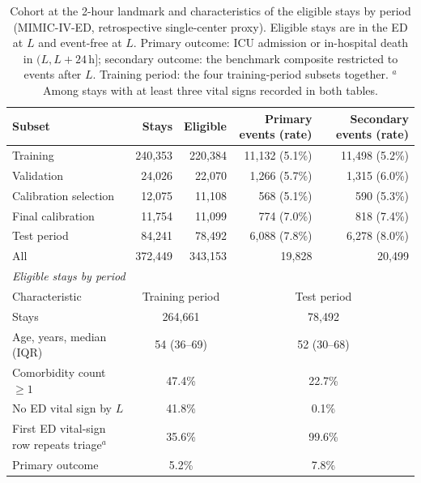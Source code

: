 \begin{table}[t]
\centering
\caption{Cohort at the 2-hour landmark and characteristics of the eligible stays by period (MIMIC-IV-ED, retrospective single-center proxy). Eligible stays are in the ED at $L$ and event-free at $L$. Primary outcome: ICU admission or in-hospital death in $(L, L+24\,\mathrm{h}]$; secondary outcome: the benchmark composite restricted to events after $L$. Training period: the four training-period subsets together. $^a$Among stays with at least three vital signs recorded in both tables.}
\label{tab:cohort}
\footnotesize
\begin{tabular}{lrrrr}
\toprule
Subset & Stays & Eligible & Primary events (rate) & Secondary events (rate) \\
\midrule
Training & 240,353 & 220,384 & 11,132 (5.1\%) & 11,498 (5.2\%) \\
Validation & 24,026 & 22,070 & 1,266 (5.7\%) & 1,315 (6.0\%) \\
Calibration selection & 12,075 & 11,108 & 568 (5.1\%) & 590 (5.3\%) \\
Final calibration & 11,754 & 11,099 & 774 (7.0\%) & 818 (7.4\%) \\
Test period & 84,241 & 78,492 & 6,088 (7.8\%) & 6,278 (8.0\%) \\
\midrule
All & 372,449 & 343,153 & 19,828 & 20,499 \\
\midrule
\multicolumn{5}{l}{\emph{Eligible stays by period}} \\
\multicolumn{1}{l}{Characteristic} & \multicolumn{2}{c}{Training period} & \multicolumn{2}{c}{Test period} \\
Stays & \multicolumn{2}{c}{264,661} & \multicolumn{2}{c}{78,492} \\
Age, years, median (IQR) & \multicolumn{2}{c}{54 (36--69)} & \multicolumn{2}{c}{52 (30--68)} \\
Comorbidity count $\geq 1$ & \multicolumn{2}{c}{47.4\%} & \multicolumn{2}{c}{22.7\%} \\
No ED vital sign by $L$ & \multicolumn{2}{c}{41.8\%} & \multicolumn{2}{c}{0.1\%} \\
First ED vital-sign row repeats triage$^a$ & \multicolumn{2}{c}{35.6\%} & \multicolumn{2}{c}{99.6\%} \\
Primary outcome & \multicolumn{2}{c}{5.2\%} & \multicolumn{2}{c}{7.8\%} \\
\bottomrule
\end{tabular}
\end{table}
